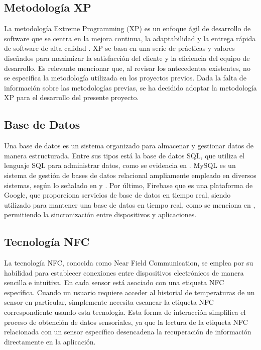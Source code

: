 \subsection{Metodología XP}
La metodología Extreme Programming (XP) es un enfoque ágil de desarrollo de software que se centra en la mejora continua, la adaptabilidad y la entrega rápida de software de alta calidad \cite{cabezas_orellana_alisis_2023}. XP se basa en una serie de prácticas y valores diseñados para maximizar la satisfacción del cliente y la eficiencia del equipo de desarrollo. Es relevante mencionar que, al revisar los antecedentes existentes, no se especifica la metodología utilizada en los proyectos previos. Dada la falta de información sobre las metodologías previas, se ha decidido adoptar la metodología XP para el desarrollo del presente proyecto.


\subsection{Base de Datos}
Una base de datos es un sistema organizado para almacenar y gestionar datos de manera estructurada. Entre sus tipos está la base de datos SQL, que utiliza el lenguaje SQL para administrar datos, como se evidencia en \cite{al-ali_iot-solar_2019}. MySQL es un sistema de gestión de bases de datos relacional ampliamente empleado en diversos sistemas, según lo señalado en \cite{alcivar_dominguez_sistema_2018} y \cite{castillo_herrero_desarrollo_2020}. Por último, Firebase que es una plataforma de Google, que proporciona servicios de base de datos en tiempo real, siendo utilizado para mantener una base de datos en tiempo real, como se menciona en \cite{ramos_galindo_diseno_2023}, permitiendo la sincronización entre dispositivos y aplicaciones.


\subsection{Tecnología NFC}
La tecnología NFC, conocida como Near Field Communication, se emplea por su habilidad para establecer conexiones entre dispositivos electrónicos de manera sencilla e intuitiva. En \cite{haiyan_intelligent_2022} cada sensor está asociado con una etiqueta NFC específica. Cuando un usuario requiere acceder al historial de temperaturas de un sensor en particular, simplemente necesita escanear la etiqueta NFC correspondiente usando esta tecnología. Esta forma de interacción simplifica el proceso de obtención de datos sensoriales, ya que la lectura de la etiqueta NFC relacionada con un sensor específico desencadena la recuperación de información directamente en la aplicación.


